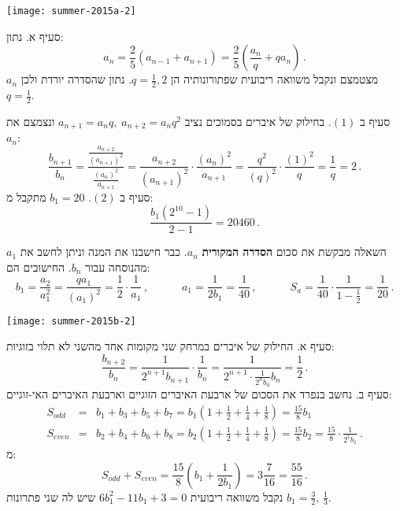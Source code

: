 \bigskip

\textbf{}

\begin{center}
\texttt{[image: summer-2015a-2]}
\end{center}
\vspace{-1ex}
סעיף א. נתון:
\[
a_n = \frac{2}{5}(a_{n-1}+a_{n+1}) =\frac{2}{5}\left(\frac{a_n}{q}+qa_n\right)\,.
\]
$a_n$
מצטמצם ונקבל משוואה ריבועית שפתורונותיה הן 
$q=\frac{1}{2},2$.
נתון שהסדרה יורדת ולכן
$q=\frac{1}{2}$.

סעיף ב
$(1)$.
בחילוק של איברים בסמוכים נציב
$a_{n+1}=a_nq,\;a_{n+2}=a_nq^2$
ונצמצם את
$a_n$:
\[
\frac{b_{n+1}}{b_n} = \frac{\displaystyle\frac{a_{n+2}}{(a_{n+1})^2}}{\displaystyle\frac{(a_{n})^2}{a_{n+1}}}= \frac{a_{n+2}}{(a_{n+1})^2}\cdot\frac{(a_{n})^2}{a_{n+1}} = \frac{q^2}{(q)^2}\cdot\frac{(1)^2}{q}=\frac{1}{q}=2\,.
\]
סעיף ב
$(2)$. 
$b_1=20$
מתקבל מ:
\[
\frac{b_1(2^{10}-1)}{2-1}=20460\,.
\]

השאלה מבקשת את סכום 
\textbf{הסדרה המקורית}
$a_{n}$.
כבר חישבנו את המנה וניתן לחשב את
$a_1$
מהנוסחה עבור 
$b_n$.
החישובים הם:
\[
b_1 = \frac{a_2}{a_1^2} = \frac{qa_1}{(a_1)^2} = \frac{1}{2}\cdot\frac{1}{a_1}\,,\quad\quad\quad a_1=\frac{1}{2b_1}=\frac{1}{40}\,,\quad\quad\quad S_a = \frac{1}{40}\cdot\frac{1}{1-\frac{1}{2}} = \frac{1}{20}\,.
\]
\vspace{-4ex}
\bigskip

\textbf{}

\begin{center}
\texttt{[image: summer-2015b-2]}
\end{center}
\vspace{-2ex}
סעיף א. החילוק של איברים במרחק שני מקומות אחד מהשני לא תלוי בזוגיות:
\[
\frac{b_{n+2}}{b_n} = \frac{1}{2^{n+1}b_{n+1}}\cdot\frac{1}{b_n}=\frac{1}{2^{n+1}\cdot\displaystyle\frac{1}{2^nb_n}{b_n}}= \frac{1}{2}\,.
\]
סעיף ב. נחשב בנפרד את הסכום של ארבעת האיברים הזוגיים וארבעת האיברים האי-זוגיים:
\begin{eqnarray*}
S_{\mathit{odd}} &=& b_1+b_3+b_5+b_7=b_1\left(1 + \frac{1}{2} + \frac{1}{4} +\frac{1}{8}\right)=\frac{15}{8}b_1\\
S_{\mathit{even}} &=& b_2+b_4+b_6+b_8=b_2\left(1 + \frac{1}{2} + \frac{1}{4} +\frac{1}{8}\right)=\frac{15}{8}b_2=\frac{15}{8}\cdot\frac{1}{2^1b_1}\,.
\end{eqnarray*}
מ:
\[
S_{\mathit{odd}} + S_{\mathit{even}} =\frac{15}{8}\left(b_1+\frac{1}{2b_1}\right)= 3\frac{7}{16}=\frac{55}{16}\,.
\]
נקבל משוואה ריבועית 
$6b_1^2-11b_1+3=0$
שיש לה שני פתרונות 
$b_1=\frac{3}{2},\,\frac{1}{3}$.


